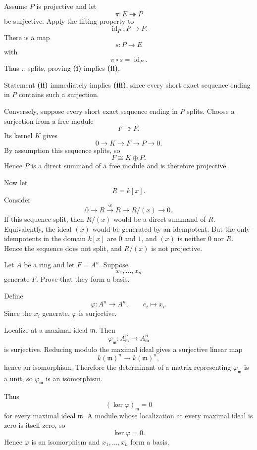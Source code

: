 \begin{solution}
Assume \(P\) is projective and let
\[
\pi:E\twoheadrightarrow P
\]
be surjective. Apply the lifting property to
\[
\operatorname{id}_P:P\to P.
\]
There is a map
\[
s:P\to E
\]
with
\[
\pi\circ s=\operatorname{id}_P.
\]
Thus \(\pi\) splits, proving \textbf{(i)} implies \textbf{(ii)}.

Statement \textbf{(ii)} immediately implies \textbf{(iii)}, since every short
exact sequence ending in \(P\) contains such a surjection.

Conversely, suppose every short exact sequence ending in \(P\) splits. Choose
a surjection from a free module
\[
F\twoheadrightarrow P.
\]
Its kernel \(K\) gives
\[
0\longrightarrow K\longrightarrow F\longrightarrow P\longrightarrow0.
\]
By assumption this sequence splits, so
\[
F\cong K\oplus P.
\]
Hence \(P\) is a direct summand of a free module and is therefore projective.

Now let
\[
R=k[x].
\]
Consider
\[
0\longrightarrow R
\xrightarrow{\cdot x}
R
\longrightarrow
R/(x)
\longrightarrow0.
\]
If this sequence split, then \(R/(x)\) would be a direct summand of \(R\).
Equivalently, the ideal \((x)\) would be generated by an idempotent. But the
only idempotents in the domain \(k[x]\) are \(0\) and \(1\), and \((x)\) is
neither \(0\) nor \(R\). Hence the sequence does not split, and \(R/(x)\) is
not projective.
\end{solution}


\begin{problem}[CP-V-0058]
\label{prob:cp-v-0058}
Let \(A\) be a ring and let \(F=A^n\). Suppose
\[
x_1,\dots,x_n
\]
generate \(F\). Prove that they form a basis.
\end{problem}

\begin{solution}
Define
\[
\varphi:A^n\to A^n,\qquad e_i\mapsto x_i.
\]
Since the \(x_i\) generate, \(\varphi\) is surjective.

Localize at a maximal ideal \(\mathfrak m\). Then
\[
\varphi_{\mathfrak m}:A_{\mathfrak m}^n\to A_{\mathfrak m}^n
\]
is surjective. Reducing modulo the maximal ideal gives a surjective linear
map
\[
k(\mathfrak m)^n\to k(\mathfrak m)^n,
\]
hence an isomorphism. Therefore the determinant of a matrix representing
\(\varphi_{\mathfrak m}\) is a unit, so \(\varphi_{\mathfrak m}\) is an
isomorphism.

Thus
\[
(\ker\varphi)_{\mathfrak m}=0
\]
for every maximal ideal \(\mathfrak m\). A module whose localization at every
maximal ideal is zero is itself zero, so
\[
\ker\varphi=0.
\]
Hence \(\varphi\) is an isomorphism and \(x_1,\dots,x_n\) form a basis.
\end{solution}



